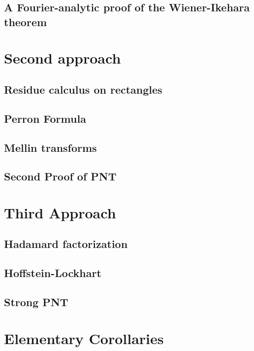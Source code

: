 \section{A Fourier-analytic proof of the Wiener-Ikehara theorem}


\chapter{Second approach}

\section{Residue calculus on rectangles}



\section{Perron Formula}


\section{Mellin transforms}


\section{Second Proof of PNT}



\chapter{Third Approach}

\section{Hadamard factorization}


\section{Hoffstein-Lockhart}


\section{Strong PNT}


\chapter{Elementary Corollaries}





